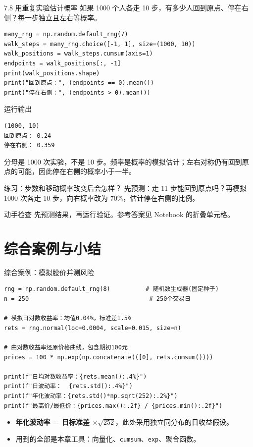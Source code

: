 \documentclass[9pt]{ctexbeamer}
\begin{document}
\begin{frame}[fragile]{7.8 用重复实验估计概率}
\small 如果 1000 个人各走 10 步，有多少人回到原点、停在右侧？每一步独立且左右等概率。
\medskip
\begin{lstlisting}
many_rng = np.random.default_rng(7)
walk_steps = many_rng.choice([-1, 1], size=(1000, 10))
walk_positions = walk_steps.cumsum(axis=1)
endpoints = walk_positions[:, -1]
print(walk_positions.shape)
print("回到原点：", (endpoints == 0).mean())
print("停在右侧：", (endpoints > 0).mean())
\end{lstlisting}
\begin{exampleblock}{运行输出}
\begin{lstlisting}
(1000, 10)
回到原点： 0.24
停在右侧： 0.359
\end{lstlisting}
\end{exampleblock}
\small 分母是 1000 次实验，不是 10 步。频率是概率的模拟估计；左右对称仍有回到原点的可能，因此停在右侧的概率小于一半。
\end{frame}

\begin{frame}{练习：步数和移动概率改变后会怎样？}
先预测：走 11 步能回到原点吗？再模拟 1000 次各走 10 步，向右概率改为 70\%，估计停在右侧的比例。
\medskip
\begin{block}{动手检查}
先预测结果，再运行验证。参考答案见 Notebook 的折叠单元格。
\end{block}
\end{frame}

\section{综合案例与小结}

\begin{frame}[fragile]{综合案例：模拟股价并测风险}
	\begin{lstlisting}
rng = np.random.default_rng(8)          # 随机数生成器(固定种子)
n = 250                                  # 250个交易日

# 模拟日对数收益率：均值0.04%，标准差1.5%
rets = rng.normal(loc=0.0004, scale=0.015, size=n)

# 由对数收益率还原价格曲线，包含期初100元
prices = 100 * np.exp(np.concatenate(([0], rets.cumsum())))

print(f"日均对数收益率：{rets.mean():.4%}")
print(f"日波动率：  {rets.std():.4%}")
print(f"年化波动率：{rets.std()*np.sqrt(252):.2%}")
print(f"最高价/最低价：{prices.max():.2f} / {prices.min():.2f}")
\end{lstlisting}
	\begin{itemize}
		\item \textbf{年化波动率 = 日标准差 $\times\sqrt{252}$}，此处采用独立同分布的日收益假设。
		\item 用到的全部是本章工具：向量化、\texttt{cumsum}、\texttt{exp}、聚合函数。
	\end{itemize}
\end{frame}
\end{document}
